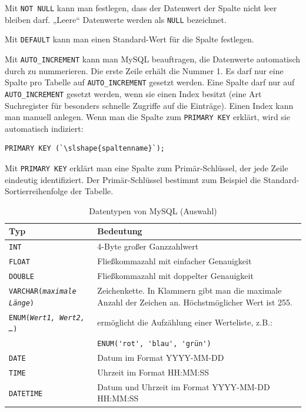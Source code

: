 Mit \lstinline{NOT NULL} kann man festlegen, dass der Datenwert der Spalte nicht
leer bleiben darf. „Leere“ Datenwerte werden als \lstinline{NULL} bezeichnet.

Mit \lstinline{DEFAULT} kann man einen Standard-Wert für die Spalte festlegen.

Mit \lstinline{AUTO_INCREMENT} kann man MySQL beauftragen, die Datenwerte
automatisch durch zu nummerieren. Die erste Zeile erhält die Nummer 1. Es darf
nur eine Spalte pro Tabelle auf \lstinline{AUTO_INCREMENT} gesetzt werden. Eine
Spalte darf nur auf \lstinline{AUTO_INCREMENT} gesetzt werden, wenn sie einen
Index besitzt (eine Art Suchregister für besonders schnelle Zugriffe auf die
Einträge). Einen Index kann man manuell anlegen. Wenn man die Spalte zum
\lstinline{PRIMARY KEY} erklärt, wird sie automatisch indiziert:

\begin{lstlisting}
PRIMARY KEY (`\slshape{spaltenname}`);
\end{lstlisting}

Mit \lstinline{PRIMARY KEY} erklärt man eine Spalte zum Primär-Schlüssel, der
jede Zeile eindeutig identifiziert. Der Primär-Schlüssel bestimmt zum Beispiel
die Standard-Sortierreihenfolge der Tabelle.

\begin{table}[h]
\centering
\begin{tabular}{|l|p{11cm}|}
\hline
{\bfseries Typ} & {\bfseries Bedeutung}\\
\hline
{\lstinline!INT!} & 4-Byte großer Ganzzahlwert\\
\hline
{\lstinline!FLOAT!} & Fließkommazahl mit einfacher Genauigkeit\\
\hline
{\lstinline!DOUBLE!} & Fließkommazahl mit doppelter Genauigkeit\\
\hline
{\lstinline!VARCHAR(!}\texttt{\slshape{maximale Länge}}{\lstinline!)!} &
Zeichenkette. In Klammern gibt man die maximale Anzahl der Zeichen an.
Höchstmöglicher Wert ist 255.\\
\hline
{\lstinline!ENUM(!}\texttt{\slshape{Wert1, Wert2, \ldots}}{\lstinline!)!}
& ermöglicht die Aufzählung einer Werteliste, z.B.:\\
& {\lstinline!ENUM('rot', 'blau', '!}\texttt{grün}{\lstinline!')!}\\
\hline
{\lstinline!DATE!} & Datum im Format YYYY-MM-DD\\
\hline
{\lstinline!TIME!} & Uhrzeit im Format HH:MM:SS\\
\hline
{\lstinline!DATETIME!} & Datum und Uhrzeit im Format YYYY-MM-DD HH:MM:SS\\
\hline
\end{tabular}
\caption{Datentypen von MySQL (Auswahl)}
\label{tab:mysql-datentypen}
\end{table}

